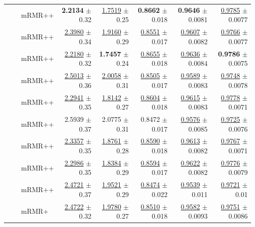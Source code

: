 \begin{longtable}{llp{}rrrrr}
 &  & mRMR++ & \textbf{2.2134} {\scriptsize $\pm$ 0.32} & \underline{1.7519} {\scriptsize $\pm$ 0.25} & \textbf{0.8662} {\scriptsize $\pm$ 0.018} & \textbf{0.9646} {\scriptsize $\pm$ 0.0081} & \underline{0.9785} {\scriptsize $\pm$ 0.0077} \\
 &  & mRMR++ & \underline{2.3980} {\scriptsize $\pm$ 0.34} & \underline{1.9160} {\scriptsize $\pm$ 0.29} & \underline{0.8551} {\scriptsize $\pm$ 0.017} & \underline{0.9607} {\scriptsize $\pm$ 0.0082} & \underline{0.9766} {\scriptsize $\pm$ 0.0077} \\
 &  & mRMR++ & \underline{2.2180} {\scriptsize $\pm$ 0.32} & \textbf{1.7457} {\scriptsize $\pm$ 0.24} & \underline{0.8655} {\scriptsize $\pm$ 0.018} & \underline{0.9636} {\scriptsize $\pm$ 0.0084} & \textbf{0.9786} {\scriptsize $\pm$ 0.0075} \\
 &  & mRMR++ & \underline{2.5013} {\scriptsize $\pm$ 0.36} & \underline{2.0058} {\scriptsize $\pm$ 0.31} & \underline{0.8505} {\scriptsize $\pm$ 0.017} & \underline{0.9589} {\scriptsize $\pm$ 0.0083} & \underline{0.9748} {\scriptsize $\pm$ 0.0078} \\
 &  & mRMR++ & \underline{2.2941} {\scriptsize $\pm$ 0.35} & \underline{1.8142} {\scriptsize $\pm$ 0.27} & \underline{0.8604} {\scriptsize $\pm$ 0.018} & \underline{0.9615} {\scriptsize $\pm$ 0.0083} & \underline{0.9778} {\scriptsize $\pm$ 0.0071} \\
 &  & mRMR++ & 2.5939 {\scriptsize $\pm$ 0.37} & 2.0775 {\scriptsize $\pm$ 0.31} & 0.8472 {\scriptsize $\pm$ 0.017} & \underline{0.9576} {\scriptsize $\pm$ 0.0085} & \underline{0.9725} {\scriptsize $\pm$ 0.0076} \\
 &  & mRMR++ & \underline{2.3357} {\scriptsize $\pm$ 0.35} & \underline{1.8761} {\scriptsize $\pm$ 0.28} & \underline{0.8590} {\scriptsize $\pm$ 0.018} & \underline{0.9613} {\scriptsize $\pm$ 0.0082} & \underline{0.9767} {\scriptsize $\pm$ 0.0071} \\
 &  & mRMR++ & \underline{2.2986} {\scriptsize $\pm$ 0.35} & \underline{1.8384} {\scriptsize $\pm$ 0.29} & \underline{0.8594} {\scriptsize $\pm$ 0.017} & \underline{0.9622} {\scriptsize $\pm$ 0.0082} & \underline{0.9776} {\scriptsize $\pm$ 0.0079} \\
 &  & mRMR++ & \underline{2.4721} {\scriptsize $\pm$ 0.37} & \underline{1.9521} {\scriptsize $\pm$ 0.29} & \underline{0.8474} {\scriptsize $\pm$ 0.022} & \underline{0.9539} {\scriptsize $\pm$ 0.011} & \underline{0.9721} {\scriptsize $\pm$ 0.01} \\
 &  & mRMR+ & \underline{2.4722} {\scriptsize $\pm$ 0.32} & \underline{1.9780} {\scriptsize $\pm$ 0.27} & \underline{0.8510} {\scriptsize $\pm$ 0.018} & \underline{0.9582} {\scriptsize $\pm$ 0.0093} & \underline{0.9751} {\scriptsize $\pm$ 0.0086} \\

\end{longtable}
